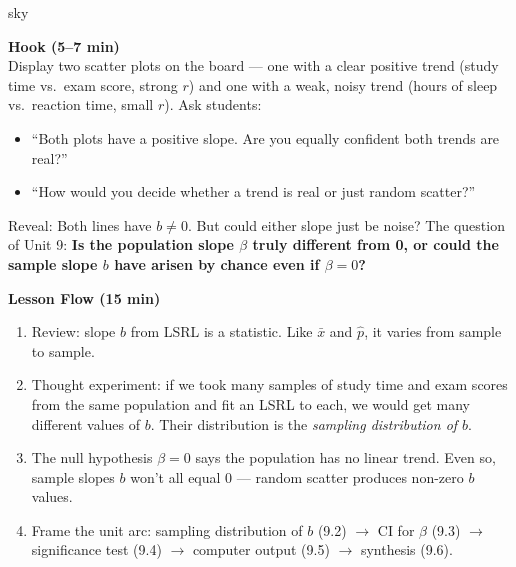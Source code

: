 \documentclass[10pt]{article}
\begin{document}
\begin{skillbox}{sky}
\begin{minipage}[t]{0.48\linewidth}
    \textbf{Hook (5--7 min)}\\
    Display two scatter plots on the board --- one with a clear positive trend (study
    time vs.\ exam score, strong $r$) and one with a weak, noisy trend (hours of sleep
    vs.\ reaction time, small $r$). Ask students:
    \begin{itemize}
        \item ``Both plots have a positive slope. Are you equally confident both
              trends are real?''
        \item ``How would you decide whether a trend is real or just random scatter?''
    \end{itemize}
    Reveal: Both lines have $b \ne 0$. But could either slope just be noise? The question
    of Unit 9: \textbf{Is the population slope $\beta$ truly different from 0, or could
    the sample slope $b$ have arisen by chance even if $\beta = 0$?}
\end{minipage}
\hfill
\begin{minipage}[t]{0.48\linewidth}
    \textbf{Lesson Flow (15 min)}
    \begin{enumerate}
        \item Review: slope $b$ from LSRL is a statistic. Like $\bar{x}$ and $\hat{p}$,
              it varies from sample to sample.
        \item Thought experiment: if we took many samples of study time and exam scores
              from the same population and fit an LSRL to each, we would get many
              different values of $b$. Their distribution is the \emph{sampling
              distribution of $b$}.
        \item The null hypothesis $\beta = 0$ says the population has no linear
              trend. Even so, sample slopes $b$ won't all equal 0 --- random scatter
              produces non-zero $b$ values.
        \item Frame the unit arc: sampling distribution of $b$ (9.2) $\to$ CI for
              $\beta$ (9.3) $\to$ significance test (9.4) $\to$ computer output (9.5)
              $\to$ synthesis (9.6).
    \end{enumerate}
\end{minipage}
\end{skillbox}
\end{document}
